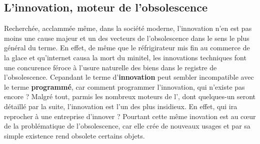 \subsection{L'innovation, moteur de l'obsolescence}
Recherchée, acclammée même, dans la société moderne, l'innovation n'en est pas moins une cause majeur et un des vecteurs de l'obsolescence dans le sens le plus général du terme. 
\smallbreak
En effet, de même que le réfrigirateur mis fin au commerce de la glace et qu'internet causa la mort du minitel, les innovations techniques font une concurence féroce à l'usure naturelle des biens dans le registre de l'obsolescence. 
\medbreak
Cepandant le terme d'\textbf{innovation} peut sembler incompatible avec le terme \textbf{programmé}, car comment programmer l'innovation, qui n'existe pas encore ?
\smallbreak
Malgré tout, parmis les nombreux moteurs de l'\op, dont quelques-un seront détaillé par la suite, l'innovation est l'un des plus insidieux.
En effet, qui ira reprocher à une entreprise d'innover ? Pourtant cette même inovation est au cœur de la problématique de l'obsolescence, car elle crée de nouveaux usages et par sa simple existence rend obsolete certains objets.

